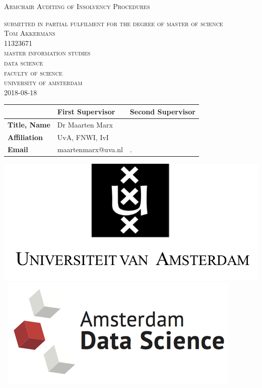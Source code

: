\begin{titlepage}
\begin{center}

\textsc{\Large Armchair Auditing of Insolvency Procedures }

\bigskip

\textsc{\large
submitted in partial fulfilment for the degree of master of science\\
%
\bigskip
Tom Akkermans\\
%
11323671\\
%
\bigskip
master information studies\\
%
data science \\
%
faculty of science\\
%
university of amsterdam\\
%
\bigskip
2018-08-18
}

\end{center}
 

\vfill

\begin{center}
\begin{tabular}{|l||ll|}
\hline
 & \textbf{First Supervisor} & \textbf{Second Supervisor}  \\   
 \hline
\textbf{Title, Name} & Dr Maarten Marx&  \\
\textbf{Affiliation} &UvA, FNWI, IvI & \\ 
\textbf{Email} & maartenmarx@uva.nl& . \\
\hline
\end{tabular}
\end{center}

\bigskip

\begin{center}
\mbox{\includegraphics[width=.2\paperwidth]{logo-uva.png} 
\includegraphics[width=.2\paperwidth]{ads.png}
}
\end{center}
\end{titlepage}

%
%
%
